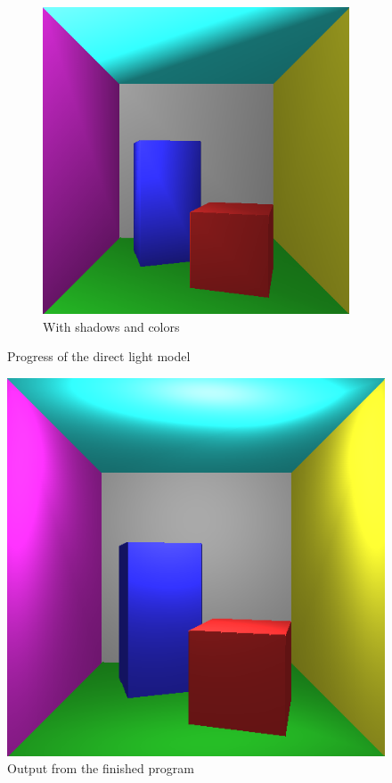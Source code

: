 \documentclass[a4paper,11pt]{article}
\begin{document}
\begin{figure}[h!]
\begin{subfigure}[h!]{0.3\linewidth}
		\includegraphics[width=\linewidth]{screenshot3.png}
		\caption{With shadows and colors}
		\label{fig4}
	\end{subfigure}
	\caption{Progress of the direct light model}
\end{figure}

\begin{figure}[h!]
	\centering	
	\includegraphics[width=0.45\linewidth]{screenshot4.png}
	\caption{Output from the finished program}
	\label{fig5}
\end{figure}
\end{document}
